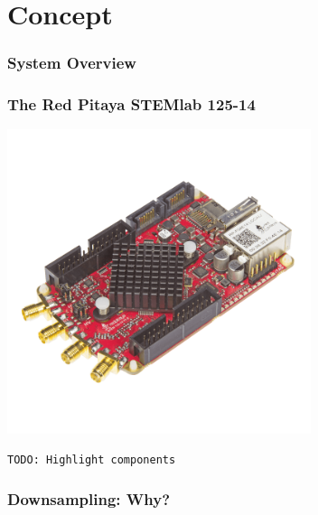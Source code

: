 \section{Concept}

\begin{frame}
    \frametitle{System Overview}
    \begin{center}
        
    \end{center}
\end{frame}

\begin{frame}
    \frametitle{The Red Pitaya STEMlab 125-14}
    \begin{center}
        \includegraphics[width=0.667\textwidth]{images/stemlab125-14-photo.png}

        \texttt{TODO: Highlight components}
    \end{center}
\end{frame}

\begin{frame}
    \frametitle{Downsampling: Why?}
    
\end{frame}

